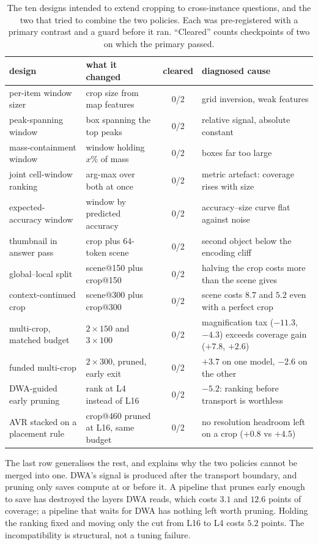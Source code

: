 \begin{table}[h]\centering\small
\caption{The ten designs intended to extend cropping to cross-instance questions, and the two that tried to
combine the two policies. Each was pre-registered with a primary contrast and a guard before it ran. ``Cleared''
counts checkpoints of two on which the primary passed.}
\begin{tabular}{p{3.2cm}p{3.5cm}cp{4.5cm}}
\toprule
design & what it changed & cleared & diagnosed cause\\
\midrule
per-item window sizer & crop size from map features & 0/2 & grid inversion, weak features\\
peak-spanning window & box spanning the top peaks & 0/2 & relative signal, absolute constant\\
mass-containment window & window holding $x\%$ of mass & 0/2 & boxes far too large\\
joint cell-window ranking & arg-max over both at once & 0/2 & metric artefact: coverage rises with size\\
expected-accuracy window & window by predicted accuracy & 0/2 & accuracy--size curve flat against noise\\
thumbnail in answer pass & crop plus $64$-token scene & 0/2 & second object below the encoding cliff\\
global--local split & scene@150 plus crop@150 & 0/2 & halving the crop costs more than the scene gives\\
context-continued crop & scene@300 plus crop@300 & 0/2 & scene costs $8.7$ and $5.2$ even with a perfect crop\\
multi-crop, matched budget & $2\times150$ and $3\times100$ & 0/2 & magnification tax ($-11.3$, $-4.3$) exceeds coverage gain ($+7.8$, $+2.6$)\\
funded multi-crop & $2\times300$, pruned, early exit & 0/2 & $+3.7$ on one model, $-2.6$ on the other\\
DWA-guided early pruning & rank at L4 instead of L16 & 0/2 & $-5.2$: ranking before transport is worthless\\
AVR stacked on a placement rule & crop@$460$ pruned at L16, same budget & 0/2 & no resolution headroom left on a crop ($+0.8$ vs $+4.5$)\\
\bottomrule
\end{tabular}\label{tab:neg}
\end{table}

The last row generalises the rest, and explains why the two policies cannot be merged into one. DWA's signal
is produced after the transport boundary, and pruning only saves compute at or before it. A pipeline that prunes
early enough to save has destroyed the layers DWA reads, which costs $3.1$ and $12.6$ points of coverage; a
pipeline that waits for DWA has nothing left worth pruning. Holding the ranking fixed and moving only the cut
from L16 to L4 costs $5.2$ points. The incompatibility is structural, not a tuning failure.

